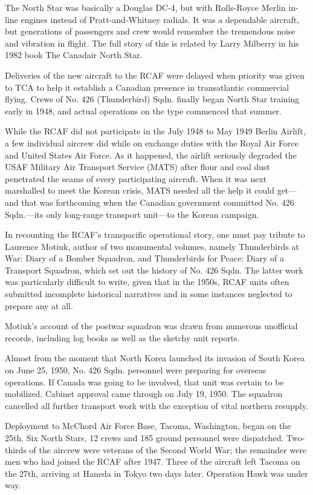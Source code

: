 The North Star was basically a Douglas DC-4, but with Rolls-Royce
Merlin in-line engines instead of Pratt-and-Whitney radials. It was a
dependable aircraft, but generations of passengers and crew would
remember the tremendous noise and vibration in flight. The full story
of this is related by Larry Milberry in his 1982 book The Canadair
North Star.

Deliveries of the new aircraft to the RCAF were delayed when
priority was given to TCA to help it establish a Canadian presence in
transatlantic commercial flying. Crews of No. 426 (Thunderbird)
Sqdn. finally began North Star training early in 1948, and actual
operations on the type commenced that summer.

While the RCAF did not participate in the July 1948 to May 1949 Berlin
Airlift, a few individual aircrew did while on exchange duties with
the Royal Air Force and United States Air Force. As it happened, the
airlift seriously degraded the USAF Military Air Transport Service
(MATS) after flour and coal dust penetrated the seams of every
participating aircraft. When it was next marshalled to meet the Korean
crisis, MATS needed all the help it could get---and that was forthcoming
when the Canadian government committed No. 426 Sqdn.---its only
long-range transport unit---to the Korean campaign.

In recounting the RCAF's transpacific operational story, one must pay
tribute to Laurence Motiuk, author of two monumental volumes, namely
Thunderbirds at War: Diary of a Bomber Squadron, and Thunderbirds for
Peace: Diary of a Transport Squadron, which set out the history of
No. 426 Sqdn. The latter work was particularly difficult to write,
given that in the 1950s, RCAF units often submitted incomplete
historical narratives and in some instances neglected to prepare any
at all.

Motiuk's account of the postwar squadron was drawn from numerous
unofficial records, including log books as well as the sketchy unit
reports.

Almost from the moment that North Korea launched its invasion of South
Korea on June 25, 1950, No. 426 Sqdn. personnel were preparing for
overseas operations. If Canada was going to be involved, that unit was
certain to be mobilized. Cabinet approval came through on July 19,
1950. The squadron cancelled all further transport work with the
exception of vital northern resupply.

Deployment to McChord Air Force Base, Tacoma, Washington, began on the
25th. Six North Stars, 12 crews and 185 ground personnel were
dispatched. Two-thirds of the aircrew were veterans of the Second
World War; the remainder were men who had joined the RCAF after
1947. Three of the aircraft left Tacoma on the 27th, arriving at
Haneda in Tokyo two days later. Operation Hawk was under way.

